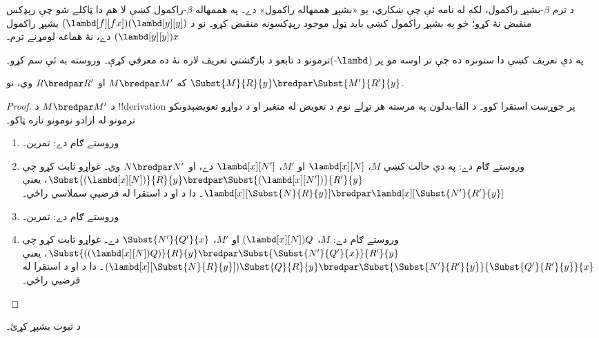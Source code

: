 \documentclass[../../../include/open-logic-section]{subfiles}
\begin{document}
د ترم $\beta$-بشپړ راکمول، لکه له نامه ئې چې ښکاري، يو
«بشپړ هممهاله راکمول» دے۔ په هممهاله $\beta$-راکمول کښې
لا هم دا ټاکلے شو چې رېډکس منقبض نۀ کړو؛ خو په بشپړ
راکمول کښې بايد ټول موجود رېډکسونه منقبض کړو۔ نو د
$(\lambd[f][fx])(\lambd[y][y])$ بشپړ راکمول
$(\lambd[y][y])x$ دے، نۀ هماغه لومړنے ترم۔

\begin{editorial}
  په دې تعريف کښې دا ستونزه ده چې تر اوسه مو پر ($\lambd$-)ترمونو
  د تابعو د بازګشتي تعريف لاره نۀ ده معرفي کړې۔ وروسته به ئې
  سم کړو۔
\end{editorial}

\begin{lem}
  که $M \bredpar M'$ او $R \bredpar R'$ وي، نو $\Subst{M}{R}{y}
  \bredpar \Subst{M'}{R'}{y}$.
\end{lem}

\begin{proof}
  د $M \bredpar M'$ د !!{derivation} پر جوړښت استقرا کوو۔ د الفا-بدلون په مرسته هر تړلے نوم د تعويض له متغير او د دواړو تعويضېدونکو ترمونو له ازادو نومونو تازه ټاکو۔
  \begin{enumerate}
    \item وروستے ګام  دے: تمرين۔
    \item وروستے ګام  دے: په دې حالت کښې $M$،
      $\lambd[x][N]$ او $M'$، $\lambd[x][N']$ دے، او
      $N \bredpar N'$ وي۔ غواړو ثابت کړو چې
      $\Subst{(\lambd[x][N])}{R}{y} \bredpar
      \Subst{(\lambd[x][N'])}{R'}{y}$، يعنې
      $\lambd[x][\Subst{N}{R}{y}] \bredpar
      \lambd[x][\Subst{N'}{R'}{y}]$۔ دا د
       او د استقرا له فرضيې سملاسي راځي۔
    \item وروستے ګام  دے: تمرين۔
    \item وروستے ګام  دے: $M$،
      $(\lambd[x][N])Q$ او $M'$، $\Subst{N'}{Q'}{x}$ دے۔ غواړو
      ثابت کړو چې $\Subst{((\lambd[x][N])Q)}{R}{y} \bredpar
      \Subst{\Subst{N'}{Q'}{x}}{R'}{y}$، يعنې
      $(\lambd[x][\Subst{N}{R}{y}])\Subst{Q}{R}{y} \bredpar
      \Subst{\Subst{N'}{R'}{y}}{\Subst{Q'}{R'}{y}}{x}$۔ دا د
       او د استقرا له فرضيې راځي۔
  \end{enumerate}
\end{proof}

\begin{prob}
  د  ثبوت بشپړ کړئ۔
\end{prob}
\end{document}
